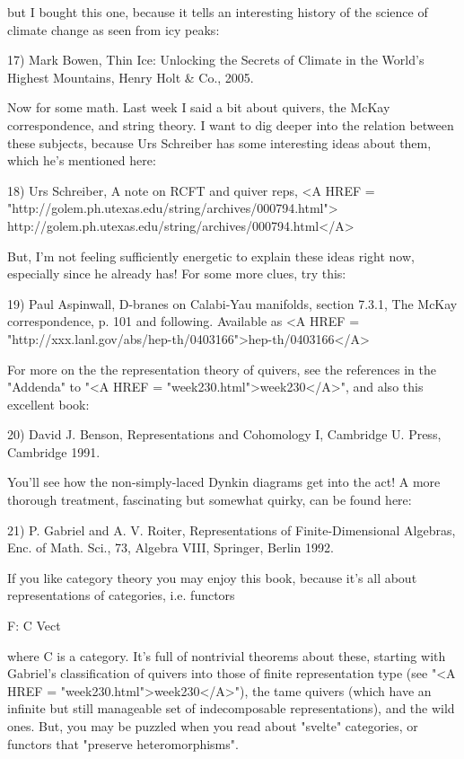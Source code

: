 but I bought this one, because it tells an interesting history of
the science of climate change as seen from icy peaks:

17) Mark Bowen, Thin Ice: Unlocking the Secrets of Climate in the
World's Highest Mountains, Henry Holt & Co., 2005.

Now for some math.
Last week I said a bit about quivers, the McKay correspondence,
and string theory.   I want to dig deeper into the relation
between these subjects, because Urs Schreiber has some interesting 
ideas about them, which he's mentioned here:

18) Urs Schreiber, A note on RCFT and quiver reps, 
<A HREF = "http://golem.ph.utexas.edu/string/archives/000794.html">
http://golem.ph.utexas.edu/string/archives/000794.html</A>

But, I'm not feeling sufficiently energetic to explain these ideas
right now, especially since he already has!  For some more clues, try
this:

19) Paul Aspinwall, D-branes on Calabi-Yau manifolds, section 
7.3.1, The McKay correspondence, p. 101 and following.  Available
as 
<A HREF = "http://xxx.lanl.gov/abs/hep-th/0403166">hep-th/0403166</A>

For more on the the representation theory of
quivers, see the references in the "Addenda" to "<A
HREF = "week230.html">week230</A>", and also this excellent
book:

20) David J. Benson, Representations and Cohomology I, 
Cambridge U. Press, Cambridge 1991.  

You'll see how the non-simply-laced Dynkin diagrams get into the
act!  A more thorough treatment, fascinating but somewhat quirky,
can be found here:

21) P. Gabriel and A. V. Roiter, Representations of Finite-Dimensional 
Algebras, Enc. of Math. Sci., 73, Algebra VIII, Springer, Berlin 1992.

If you like category theory you may enjoy this book, because
it's all about representations of categories, i.e. functors

F: C \to  Vect

where C is a category.  It's full of nontrivial theorems about these,
starting with Gabriel's classification of quivers into those of finite
representation type (see "<A HREF =
"week230.html">week230</A>"), the tame quivers (which have an
infinite but still manageable set of indecomposable representations), 
and the wild ones.   
But, you may be puzzled when you read about "svelte"
categories, or functors that "preserve heteromorphisms".

